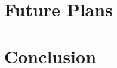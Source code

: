 \documentclass[11pt
              , a4paper
              , twoside
              , openright
              ]{report}
\begin{document}
\chapter{Future Plans}
\chapter{Conclusion}
\backmatter


%
\nocite{*}


\end{document}
